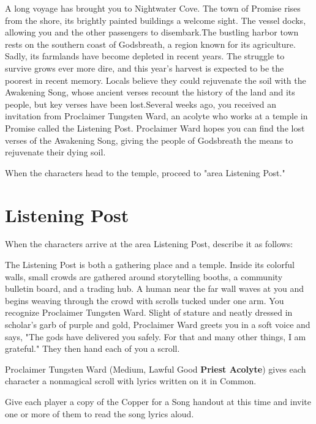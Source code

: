 \documentclass[letterpaper, 11pt, twocolumn]{dndbook}
\begin{document}
\begin{DndReadAloud}
A long voyage has brought you to Nightwater Cove. The town of Promise rises from the shore, its brightly painted buildings a welcome sight. The vessel docks, allowing you and the other passengers to disembark.The bustling harbor town rests on the southern coast of Godsbreath, a region known for its agriculture. Sadly, its farmlands have become depleted in recent years. The struggle to survive grows ever more dire, and this year's harvest is expected to be the poorest in recent memory. Locals believe they could rejuvenate the soil with the Awakening Song, whose ancient verses recount the history of the land and its people, but key verses have been lost.Several weeks ago, you received an invitation from Proclaimer Tungsten Ward, an acolyte who works at a temple in Promise called the Listening Post. Proclaimer Ward hopes you can find the lost verses of the Awakening Song, giving the people of Godsbreath the means to rejuvenate their dying soil.
\end{DndReadAloud}

When the characters head to the temple, proceed to "area Listening Post."
\section{Listening Post}

When the characters arrive at the area Listening Post, describe it as follows:

\begin{DndReadAloud}
The Listening Post is both a gathering place and a temple. Inside its colorful walls, small crowds are gathered around storytelling booths, a community bulletin board, and a trading hub. A human near the far wall waves at you and begins weaving through the crowd with scrolls tucked under one arm. You recognize Proclaimer Tungsten Ward. Slight of stature and neatly dressed in scholar's garb of purple and gold, Proclaimer Ward greets you in a soft voice and says, "The gods have delivered you safely. For that and many other things, I am grateful." They then hand each of you a scroll.
\end{DndReadAloud}

Proclaimer Tungsten Ward (Medium, Lawful Good \textbf{Priest Acolyte}) gives each character a nonmagical scroll with lyrics written on it in Common.

Give each player a copy of the Copper for a Song handout at this time and invite one or more of them to read the song lyrics aloud.
\end{document}

